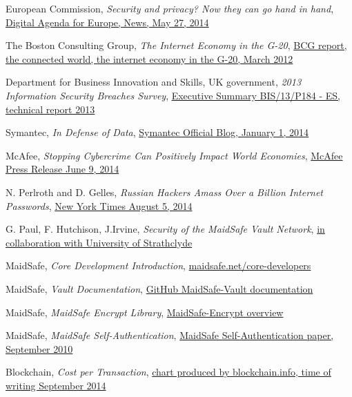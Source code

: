 \documentclass[twocolumn,english]{article}
\begin{document}
\begin{thebibliography}{9}
 European Commission, \emph{Security and privacy? Now they can go hand in hand}, \href{https://ec.europa.eu/digital-agenda/en/news/security-and-privacy-now-they-can-go-hand-hand}{Digital Agenda for Europe, News, May 27, 2014}

 The Boston Consulting Group, \emph{The Internet Economy in the G-20}, \href{https://www.bcg.com/documents/file100409.pdf}{BCG report, the connected world, the internet economy in the G-20, March 2012}

 Department for Business Innovation and Skills, UK government, \emph{2013 Information Security Breaches Survey}, \href{https://www.gov.uk/government/uploads/system/uploads/attachment_data/file/191671/bis-13-p184es-2013-information-security-breaches-survey-executive-summary.pdf}{Executive Summary BIS/13/P184 - ES, technical report 2013}

 Symantec, \emph{In Defense of Data}, \href{http://www.symantec.com/connect/blogs/data-breach-trends}{Symantec Official Blog, January 1, 2014}

 McAfee, \emph{Stopping Cybercrime Can Positively Impact World Economies}, \href{http://www.mcafee.com/uk/about/news/2014/q2/20140609-01.aspx}{McAfee Press Release June 9, 2014}

 N. Perlroth and D. Gelles, \emph{Russian Hackers Amass Over a Billion Internet Passwords}, \href{http://www.nytimes.com/2014/08/06/technology/russian-gang-said-to-amass-more-than-a-billion-stolen-internet-credentials.html}{New York Times August 5, 2014}

 G. Paul, F. Hutchison, J.Irvine, \emph{Security of the MaidSafe Vault Network}, \href{https://pure.strath.ac.uk/portal/files/34898763/Paul_etal_wwrf32_vault_network.pdf}{in collaboration with University of Strathclyde}

 MaidSafe, \emph{Core Development Introduction}, \href{http://maidsafe.net/core-developers}{maidsafe.net/core-developers}

 MaidSafe, \emph{Vault Documentation}, \href{https://github.com/maidsafe/MaidSafe-Vault/wiki/Documentation}{GitHub MaidSafe-Vault documentation}

 MaidSafe, \emph{MaidSafe Encrypt Library}, \href{http://maidsafe.net/libraries-encrypt}{MaidSafe-Encrypt overview}

 MaidSafe, \emph{MaidSafe Self-Authentication}, \href{http://maidsafe.net/Whitepapers/pdf/SelfAuthentication.pdf}{MaidSafe Self-Authentication paper, September 2010}

 Blockchain, \emph{Cost per Transaction}, \href{https://blockchain.info/charts/cost-per-transaction}{chart produced by blockchain.info, time of writing September 2014}

\end{thebibliography}
\end{document}
